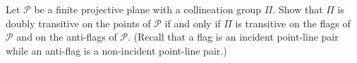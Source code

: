 Let $\mathcal{P}$ be a finite projective plane with a collineation group $\Pi$. Show that $\Pi$ is doubly transitive on the points of $\mathcal{P}$ if and only if $\Pi$ is transitive on the flags of $\mathcal{P}$ and on the anti-flags of $\mathcal{P}$. (Recall that a flag is an incident point-line pair while an anti-flag is a non-incident point-line pair.)
